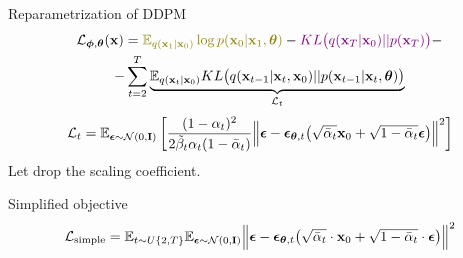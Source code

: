 \begin{frame}{Reparametrization of DDPM}
	\begin{multline*}
		\cL_{\bphi, \btheta}(\bx) =  {\color{olive}\bbE_{q(\bx_1 | \bx_0)} \log p(\bx_0 | \bx_1, \btheta)} - {\color{violet}KL\bigl(q(\bx_T | \bx_0) || p(\bx_T)\bigr)} - \\
		- \sum_{t=2}^T \underbrace{ \bbE_{q(\bx_t | \bx_0)} KL \bigl(q(\bx_{t-1} | \bx_t, \bx_0) || p(\bx_{t - 1} | \bx_t, \btheta )\bigr)}_{\cL_t}
	\end{multline*}
	\vspace{-0.3cm}
	\[
		\mathcal{L}_t  = \mathbb{E}_{\boldsymbol{\epsilon} \sim \mathcal{N}(0, \mathbf{I})} \left[ \frac{(1 - \alpha_t)^2}{2\tilde{\beta}_t \alpha_t (1 - \bar{\alpha}_t)} \Bigl\| \boldsymbol{\epsilon} - \boldsymbol{\epsilon}_{\boldsymbol{\theta}, t}\bigl( \sqrt{\bar{\alpha}_t} \mathbf{x}_0 + \sqrt{1 - \bar{\alpha}_t} \boldsymbol{\epsilon}\bigr) \Bigr\|^2 \right]
	\]
	Let drop the scaling coefficient.
	\begin{block}{Simplified objective}
		\vspace{-0.3cm}
		\[
			 \mathcal{L}_{\text{simple}} = \mathbb{E}_{t \sim U\{2, T\}} \mathbb{E}_{\boldsymbol{\epsilon} \sim \mathcal{N}(0, \mathbf{I})} \Bigl\| \boldsymbol{\epsilon} - \boldsymbol{\epsilon}_{\boldsymbol{\theta}, t}\bigl( \sqrt{\bar{\alpha}_t} \cdot \mathbf{x}_0 + \sqrt{1 - \bar{\alpha}_t} \cdot \boldsymbol{\epsilon}\bigr) \Bigr\|^2 
		\]
	\end{block}
	\end{frame}
